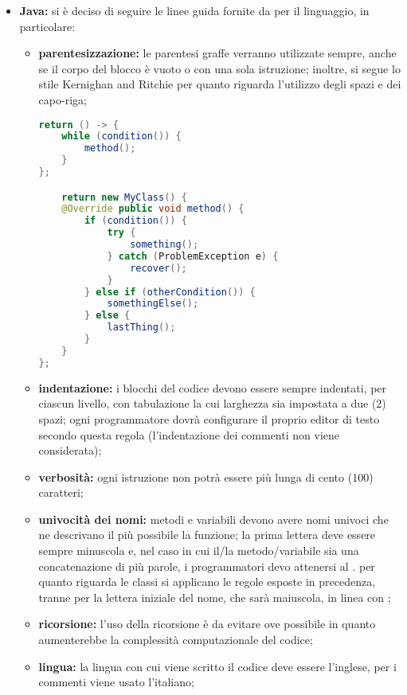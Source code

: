 					\begin{itemize}
						\item \textbf{Java:} si è deciso di seguire le linee guida fornite da  per il linguaggio, in particolare:
							\begin{itemize}
								\item \textbf{parentesizzazione:} le parentesi graffe verranno utilizzate sempre, anche se il corpo del blocco è vuoto o con una sola istruzione; inoltre, si segue lo stile Kernighan and Ritchie per quanto riguarda l'utilizzo degli spazi e dei capo-riga;
									\begin{lstlisting}[language=java,captionpos=b,caption={Esempio per la sintassi Java}]
return () -> {
	while (condition()) {
		method();
	}
};

	return new MyClass() {
	@Override public void method() {
		if (condition()) {
			try {
				something();
			} catch (ProblemException e) {
				recover();
			}
		} else if (otherCondition()) {
			somethingElse();
		} else {
			lastThing();
		}
	}
};
									\end{lstlisting}
								\item \textbf{indentazione:} i blocchi del codice devono essere sempre indentati, per ciascun livello, con tabulazione la cui larghezza sia impostata a due (2) spazi; ogni programmatore dovrà configurare il proprio editor di testo secondo questa regola (l'indentazione dei commenti non viene considerata);
								\item \textbf{verbosità:} ogni istruzione non potrà essere più lunga di cento (100) caratteri;
								\item \textbf{univocità dei nomi:} metodi e variabili devono avere nomi univoci che ne descrivano il più possibile la funzione; la prima lettera deve essere sempre minuscola e, nel caso in cui il/la metodo/variabile sia una concatenazione di più parole, i programmatori devo attenersi al . per quanto riguarda le classi si applicano le regole esposte in precedenza, tranne per la lettera iniziale del nome, che sarà maiuscola, in linea con ;
								\item \textbf{ricorsione:} l’uso della ricorsione è da evitare ove possibile in quanto aumenterebbe la complessità computazionale del codice;
								\item \textbf{lingua:} la lingua con cui viene scritto il codice deve essere l’inglese, per i commenti viene usato l'italiano;


\end{itemize}
\end{itemize}
